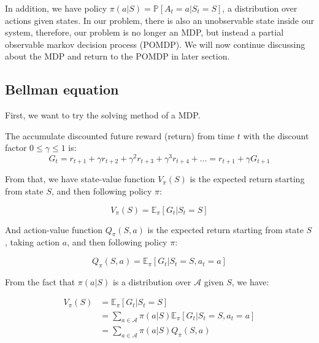\documentclass[
  a4paper, xcolor = usenames,dvipsnames]{article}
\begin{document}
In addition, we have policy \(\pi(a | S) = \mathbb{P}[A_{t} = a | S_{t} = S]\), a distribution over actions given states. In our problem, there is also an unobservable state inside our system, therefore, our problem is no longer an MDP, but instead a partial observable markov decision process (POMDP). We will now continue discussing about the MDP and return to the POMDP in later section.

\hypertarget{bellman-equation}{%
\subsection{Bellman equation}\label{bellman-equation}}

First, we want to try the solving method of a MDP.

The accumulate discounted future reward (return) from time \(t\) with the discount factor \(0 \le \gamma \le 1\) is:
\[
G_{t} = r_{t + 1} + \gamma r_{t + 2} + \gamma^{2} r_{t + 3} + \gamma^{3} r_{t + 4} + \dots = r_{t + 1} + \gamma G_{t + 1}
\]

From that, we have state-value function \(V_{\pi}(S)\) is the expected return starting from state \(S\), and then following policy \(\pi\):

\begin{equation}
V_{\pi}(S) = \mathbb{E}_{\pi}[G_{t} | S_{t} = S]
\label{eq:state-value}
\end{equation}

And action-value function \(Q_{\pi}(S, a)\) is the expected return starting from state \(S\), taking action \(a\), and then following policy \(\pi\):

\begin{equation}
Q_{\pi}(S, a) = \mathbb{E}_{\pi}[G_{t} | S_{t} = S, a_{t} = a]
\label{eq:action-value}
\end{equation}

From the fact that \(\pi(a | S)\) is a distribution over \(\mathcal{A}\) given \(S\), we have:

\begin{equation}
\begin{split}
V_{\pi}(S) {}&= \mathbb{E}_{\pi}[G_{t} | S_{t} = S] \\
  &= \sum_{a \in \mathcal{A}} \pi(a | S) \mathbb{E}_{\pi}[G_{t} | S_{t} = S, a_{t} = a] \\
  &= \sum_{a \in \mathcal{A}} \pi(a | S) Q_{\pi}(S, a)
\label{eq:v-to-q}
\end{split}
\end{equation}
\end{document}
